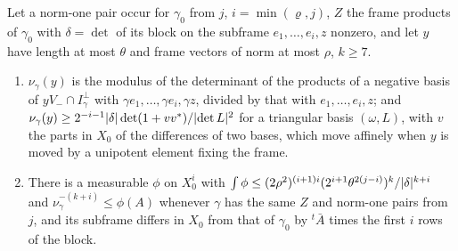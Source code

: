 \begin{proposition}\label{prop:volume-ratio}
Let a norm-one pair occur for $\gamma_0$ from $j$, $i=\min(\varrho,j)$, $Z$ the frame products of $\gamma_0$ with $\delta=\det$ of its block on the subframe $e_1,\dots,e_i,z$ nonzero, and let $y$ have length at most $\theta$
and frame vectors of norm at most $\rho$, $k\ge7$.
\begin{enumerate}[label=\textup{(\alph*)}]
\item $\nu_\gamma(y)$ is the modulus of the determinant of the products of a negative basis of $yV_-\cap I_\gamma^\perp$ with $\gamma e_1,\dots,\gamma e_i,\gamma z$, divided by that with $e_1,\dots,e_i,z$; and
$\nu_\gamma(y)\ge2^{-i-1}\lvert \delta\rvert\det(1+vv^*)/\lvert \det L\rvert^2$ for a triangular basis $(\omega,L)$, with $v$ the parts in $X_0$ of the differences of two bases, which move affinely when $y$ is moved by a
unipotent element fixing the frame.
\item There is a measurable $\phi$ on $X_0^i$ with $\int\phi\le(2\rho^2)^{(i+1)i}(2^{i+1}\theta^{2(j-i)})^k/\lvert \delta\rvert^{k+i}$ and $\nu_\gamma^{-(k+i)}\le\phi(A)$ whenever $\gamma$ has the same $Z$ and norm-one pairs from $j$, and
its subframe differs in $X_0$ from that of $\gamma_0$ by ${}^t\bar A$ times the first $i$ rows of the block.
\end{enumerate}
\end{proposition}


